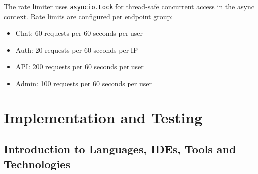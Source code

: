 \documentclass[12pt,a4paper]{report}
\begin{document}
The rate limiter uses \texttt{asyncio.Lock} for thread-safe concurrent access in the async context. Rate limits are configured per endpoint group:

\begin{itemize}[nosep]
    \item Chat: 60 requests per 60 seconds per user
    \item Auth: 20 requests per 60 seconds per IP
    \item API: 200 requests per 60 seconds per user
    \item Admin: 100 requests per 60 seconds per user
\end{itemize}

\chapter{Implementation and Testing}

\section{Introduction to Languages, IDEs, Tools and Technologies}
\end{document}
